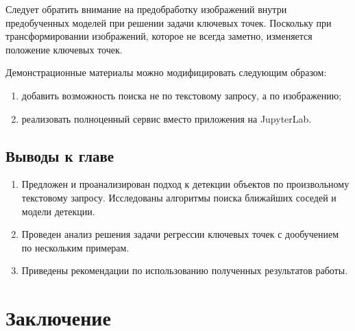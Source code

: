 \documentclass[a4paper,14pt]{article}
\begin{document}
    Следует обратить внимание на предобработку изображений внутри предобученных моделей при решении задачи ключевых точек. Поскольку при трансформировании изображений, которое не всегда заметно, изменяется положение ключевых точек.

	Демонстрационные материалы можно модифицировать следующим образом:
	\begin{enumerate}
		[1)]
		\itemsep0em
		\item добавить возможность поиска не по текстовому запросу, а по изображению;
		\item реализовать полноценный сервис вместо приложения на JupyterLab.
	\end{enumerate}
    
    \subsection{Выводы к главе \thesection}
    \begin{enumerate}
        \itemsep0em
        \item Предложен и проанализирован подход к детекции объектов по произвольному текстовому запросу. Исследованы алгоритмы поиска ближайших соседей и модели детекции.
        \item Проведен анализ решения задачи регрессии ключевых точек с дообучением по нескольким примерам.
        \item Приведены рекомендации по использованию полученных результатов работы.
    \end{enumerate}

    \newpage


    \section{Заключение}
    
\end{document}
